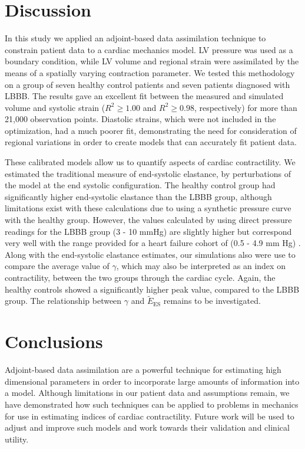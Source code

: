 \documentclass[times]{elsarticle}
\newcommand{\es}{_{\text{ES}}}
\begin{document}
\section{Discussion}
In this study we applied an adjoint-based data assimilation technique
to constrain patient data to a cardiac mechanics model.
LV pressure was used as a boundary condition, while LV
volume and regional strain were assimilated by the means of a
spatially varying contraction parameter. We tested this methodology on a group of
seven healthy control patients and seven patients
diagnosed with LBBB. The results gave an excellent fit between the measured
and simulated volume and systolic strain ($R^2 \geq 1.00$ and $R^2
\geq 0.98$, respectively) for more than 21,000 observation points.
Diastolic strains, which were not included in the optimization, had a
much poorer fit, demonstrating the need for consideration of regional
variations in order to create models that can accurately fit patient
data.   

These calibrated models allow us to quantify aspects of cardiac
contractility.   We estimated the traditional measure of end-systolic
elastance, by perturbations of the model at the end systolic
configuration.  The healthy control group had significantly higher
end-systolic elastance than the LBBB group, although limitations exist
with these calculations due to using a synthetic pressure curve with
the healthy group.  However, the values calculated by using direct
pressure readings for the LBBB group (3 - 10 mmHg) are slightly higher
but correspond very well with the range provided for a heart failure
cohort of (0.5 - 4.9 mm Hg) \cite{senzaki1996single}.  Along with the
end-systolic elastance estimates, our simulations also were use to
compare the average value of $\gamma$, which may also be interpreted
as an index on contractility, between the two groups through the
cardiac cycle. Again, the healthy controls showed a significantly
higher peak value, compared to the LBBB group. The relationship
between $\gamma$ and $\tilde{E}\es$ remains to be investigated.


\section{Conclusions}

Adjoint-based data assimilation are a powerful technique for
estimating high dimensional parameters in order to incorporate large
amounts of information into a model. Although limitations in our
patient data and assumptions remain, we have demonstrated how such
techniques can be applied to problems in mechanics for use in
estimating indices of cardiac contractility.   Future work will be
used to adjust and improve such models and work towards their
validation and clinical utility.   
\end{document}
